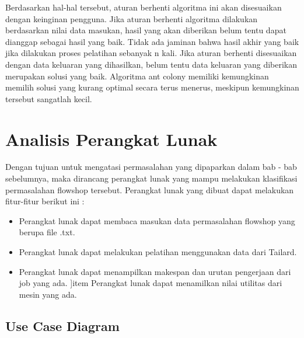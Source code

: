 	Berdasarkan hal-hal tersebut, aturan berhenti algoritma ini akan disesuaikan dengan keinginan
	pengguna. Jika aturan berhenti algoritma dilakukan berdasarkan nilai data masukan, hasil yang
	akan diberikan belum tentu dapat dianggap sebagai hasil yang baik. Tidak ada jaminan bahwa hasil
	akhir yang baik jika dilakukan proses pelatihan sebanyak n kali. Jika aturan berhenti disesuaikan
	dengan data keluaran yang dihasilkan, belum tentu data keluaran yang diberikan merupakan solusi
	yang baik. Algoritma ant colony memiliki kemungkinan memilih solusi yang kurang optimal secara
	terus menerus, meskipun kemungkinan tersebut sangatlah kecil.
	
	\section{Analisis Perangkat Lunak}
	
	Dengan tujuan untuk mengatasi permasalahan yang dipaparkan dalam bab - bab sebelumnya, maka dirancang perangkat
	lunak yang mampu melakukan klasifikasi permasalahan flowshop tersebut. Perangkat lunak
	yang dibuat dapat melakukan fitur-fitur berikut ini :
	\begin{itemize}
		\item Perangkat lunak dapat membaca masukan data permasalahan flowshop yang berupa file .txt.
		\item Perangkat lunak dapat melakukan pelatihan menggunakan data dari Tailard.
		\item Perangkat lunak dapat menampilkan makespan dan urutan pengerjaan dari job yang ada.
		]item Perangkat lunak dapat menamilkan nilai utilitas dari mesin yang ada.
	\end{itemize}

	\newpage
	\subsection{Use Case Diagram}
	
